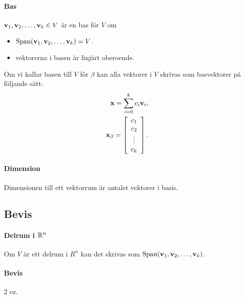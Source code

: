 \paragraph{Bas}
$\vect{v}_1, \vect{v}_2, \dots, \vect{v}_k\in V$ är en bas för $V$ om
\begin{itemize}
	\item $\Span(\vect{v}_1, \vect{v}_2, \dots, \vect{v}_k) = V$.
	\item vektorerna i basen är linjärt oberoende.
\end{itemize}
Om vi kallar basen till $V$ för $\beta$ kan alla vektorer i $V$ skrivas som basvektorer på följande sätt:
\begin{align*}
	\vect{x} = \sum\limits_{i = 0}^{k}c_i\vect{v}_i, \\
	\vect{x}_\beta =
	\left[\begin{array}{c}
		c_1 \\
		c_2 \\
		\vdots \\
		c_k
	\end{array}\right].
\end{align*}

\paragraph{Dimension}
Dimensionen till ett vektorrum är antalet vektorer i basis.

\subsection{Bevis}

\paragraph{Delrum i $\mathbb{R}^n$}
Om $V$ är ett delrum i $R^n$ kan det skrivas som $\Span(\vect{v}_1, \vect{v}_2, \dots, \vect{v}_k)$.

\paragraph{Bevis}
2 ez.